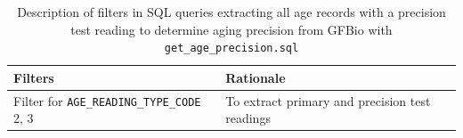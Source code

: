 \documentclass[11pt]{book}\usepackage[]{graphicx}\usepackage[]{color}
\begin{document}
\begin{table}[htp]
\centering
\caption{Description of filters in SQL queries extracting all age records with a precision test reading to determine aging precision from {GFBio} with \texttt{get\_age\_precision.sql}}
\label{tab:sql-age-precision}
{\tabulinesep=1.6mm
\begin{tabu}{>{\raggedright\arraybackslash}m{2.8in}>{\raggedright\arraybackslash}m{3.2in}}
\toprule
Filters                                                                                                            & Rationale                                                                \\
\midrule
Filter for \texttt{AGE\_READING\_TYPE\_CODE} 2, 3                                                                     & To extract primary and precision test readings                           \\
\bottomrule
\end{tabu}}
\end{table}

%
\end{document}
